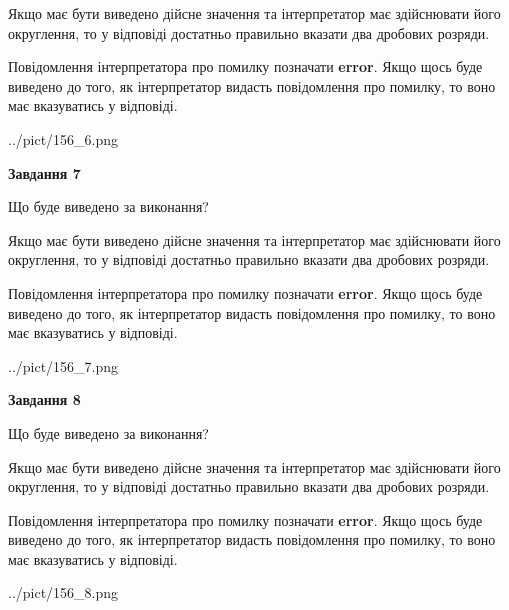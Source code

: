 \documentclass[12pt, ukrainian]{article}
\begin{document}
{\begin {Large}
Якщо має бути виведено дійсне значення та інтерпретатор має здійснювати його округлення, 
то у відповіді достатньо правильно вказати два дробових розряди.

Повідомлення інтерпретатора про помилку позначати \textbf{error}.
Якщо щось буде виведено до того, як інтерпретатор видасть повідомлення про помилку, 
то воно має вказуватись у відповіді. \par

\begin{center}
	{../pict/156_6.png}
\end{center}
\newpage

{\begin {center}\textbf{Завдання 7}\end {center}}\par
Що буде виведено за виконання? \par

Якщо має бути виведено дійсне значення та інтерпретатор має здійснювати його округлення, 
то у відповіді достатньо правильно вказати два дробових розряди.

Повідомлення інтерпретатора про помилку позначати \textbf{error}.
Якщо щось буде виведено до того, як інтерпретатор видасть повідомлення про помилку, 
то воно має вказуватись у відповіді. \par

\begin{center}
	{../pict/156_7.png}
\end{center}
\newpage

{\begin {center}\textbf{Завдання 8}\end {center}}\par
Що буде виведено за виконання? \par

Якщо має бути виведено дійсне значення та інтерпретатор має здійснювати його округлення, 
то у відповіді достатньо правильно вказати два дробових розряди.

Повідомлення інтерпретатора про помилку позначати \textbf{error}.
Якщо щось буде виведено до того, як інтерпретатор видасть повідомлення про помилку, 
то воно має вказуватись у відповіді. \par

\begin{center}
	{../pict/156_8.png}
\end{center}
\newpage


\end{Large}}
\end{document}
